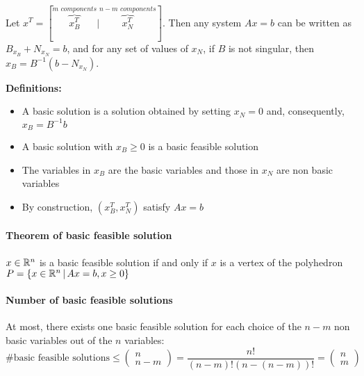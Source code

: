 \documentclass[english]{article}
\begin{document}
Let \(x^T = [ \overbrace{x_B^T}^{m\textit{ components}} |  \overbrace{x_N^T}^{n-m\textit{ components}}]\).
Then any system \(Ax = b\) can be written as \(B _{x_B} + N_{x_N} = b\), and for any set of values of \(x_N\), if \(B\) is not singular, then \(x_B = B^{-1} (b - N_{x_N})\).

\textbf{Definitions:}
\begin{itemize}
  \item A basic solution is a solution obtained by setting \(x_N = 0\) and, consequently, \(x_B = B^{-1} b\)
  \item A basic solution with \(x_B \geq 0\) is a basic feasible solution
  \item The variables in \(x_B\) are the basic variables and those in \(x_N\) are non basic variables
  \item By construction, \(\left( x_B^T, x_N^T \right)\) satisfy \(Ax = b\)
\end{itemize}

\paragraph{Theorem of basic feasible solution}

\(x \in \mathbb{R}^n\) is a basic feasible solution if and only if \(x\) is a vertex of the polyhedron \(P = \left\{ x \in \mathbb{R}^n \, | \, Ax = b, x \geq 0 \right\}\)

\paragraph{Number of basic feasible solutions}

At most, there exists one basic feasible solution for each choice of the \(n-m\) non basic variables out of the \(n\) variables:
\[\text{\# basic feasible solutions} \leq
  \begin{pmatrix}
    n \\ n-m
  \end{pmatrix}
  = \dfrac{n!}{\left( n - m \right)! \left( n - \left( n-m \right) \right)!} =
  \begin{pmatrix}
    n \\ m
  \end{pmatrix}
\]

\end{document}
